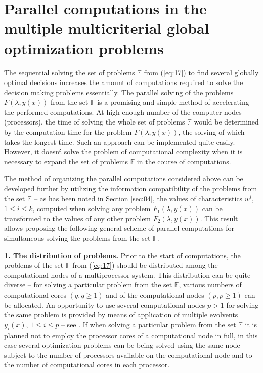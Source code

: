 \documentclass{svproc}
\begin{document}
\section{Parallel computations in the multiple multicriterial global optimization problems} 
\label{sec:05}

The sequential solving the set of problems $\mathbb{F}$ from (\ref{eq:17}) to find several globally optimal decisions increases the amount of computations required to solve the decision making problems essentially. The parallel solving of the problems $F(\lambda,y(x))$ from the set $\mathbb{F}$ is a promising and simple method of accelerating the performed computations. At high enough number of the computer nodes (processors), the time of solving the whole set of problems $\mathbb{F}$ would be determined by the computation time for the problem $F(\lambda,y(x))$, the solving of which takes the longest time. Such an approach can be implemented quite easily. However, it doesn\'t solve the problem of computational complexity when it is necessary to expand the set of problems $\mathbb{F}$ in the course of computations.

The method of organizing the parallel computations considered above can be developed further by utilizing the information compatibility of the problems from the set $\mathbb{F}$ -- as has been noted in Section {\ref{sec:04}}, the values of characteristics $w^i$, $1 \leq i \leq k$, computed when solving any problem $F_1(\lambda,y(x))$ can be transformed to the values of any other problem $F_2(\lambda,y(x))$. This result allows proposing the following general scheme of parallel computations for simultaneous solving the problems from the set $\mathbb{F}$.

\textbf{1. The distribution of problems.} Prior to the start of computations, the problems of the set $\mathbb{F}$ from (\ref{eq:17}) should be distributed among the computational nodes of a multiprocessor system. This distribution can be quite diverse -- for solving a particular problem from the set $\mathbb{F}$, various numbers of computational cores $(q, q \geq 1)$ and of the computational nodes $(p, p \geq 1)$ can be allocated. An opportunity to use several computational nodes $p>1$ for solving the same problem is provided by means of application of multiple evolvents $y_i (x)$, $1\leq i\leq p$ -- see \cite{x13,x14}. If when solving a particular problem from the set $\mathbb{F}$ it is planned not to employ the processor cores of a computational node in full, in this case several optimization problems can be being solved using the same node subject to the number of processors available on the computational node and to the number of computational cores in each processor. 
\end{document}
